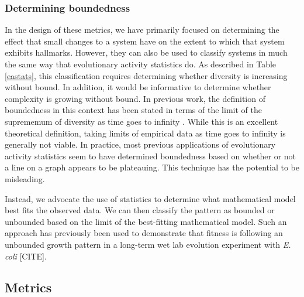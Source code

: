 \documentclass[letterpaper]{article}
\begin{document}
\subsubsection{Determining boundedness}

In the design of these metrics, we have primarily focused on determining the effect that small changes to a system have on the extent to which that system exhibits hallmarks. However, they can also be used to classify systems in much the same way that evolutionary activity statistics do. As described in Table \ref{eastats}, this classification requires determining whether diversity is increasing without bound. In addition, it would be informative to determine whether complexity is growing without bound. In previous work, the definition of boundedness in this context has been stated in terms of the limit of the suprememum of diversity as time goes to infinity \citep{bedau_classification_1998}. While this is an excellent theoretical definition, taking limits of empirical data as time goes to infinity is generally not viable. In practice, most previous applications of evolutionary activity statistics seem to have determined boundedness based on whether or not a line on a graph appears to be plateauing. This technique has the potential to be misleading.

Instead, we advocate the use of statistics to determine what mathematical model best fits the observed data. We can then classify the pattern as bounded or unbounded based on the limit of the best-fitting mathematical model. Such an approach has previously been used to demonstrate that fitness is following an unbounded growth pattern in a long-term wet lab evolution experiment with \textit{E. coli} [CITE].

\subsection{Metrics}
\end{document}
